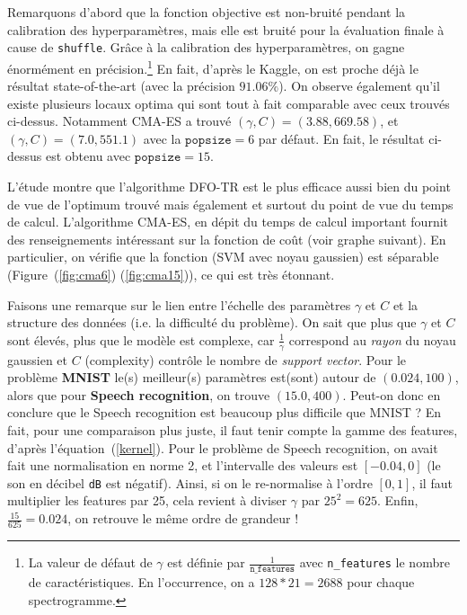 \documentclass[12 pt, a4paper]{article}
\begin{document}
Remarquons d'abord que la fonction objective est non-bruité pendant la calibration des hyperparamètres, mais elle est bruité pour la évaluation finale à cause de \texttt{shuffle}. Grâce à la calibration des hyperparamètres, on gagne énormément en précision.\footnote{La valeur de défaut de $\gamma$ est définie par $\frac{1}{\texttt{n\_features}}$ avec \texttt{n\_features} le nombre de caractéristiques. En l'occurrence, on a $128*21 = 2688$ pour chaque spectrogramme.} En fait, d'après le Kaggle, on est proche déjà le résultat state-of-the-art (avec la précision $91.06\%$)\cite{leaderboard}. On observe également qu'il existe plusieurs locaux optima qui sont tout à fait comparable avec ceux trouvés ci-dessus. Notamment CMA-ES a trouvé $(\gamma, C) = (3.88, 669.58)$, et $(\gamma, C) = (7.0, 551.1)$ avec la $\texttt{popsize}=6$ par défaut. En fait, le résultat ci-dessus est obtenu avec $\texttt{popsize} = 15$.


L'étude montre que l'algorithme DFO-TR est le plus efficace aussi bien du point de vue de l'optimum trouvé mais également et surtout du point de vue du temps de calcul. L'algorithme CMA-ES, en dépit du temps de calcul important fournit des renseignements intéressant sur la fonction de coût (voir graphe suivant). En particulier, on vérifie que la fonction (SVM avec noyau gaussien) est séparable (Figure~(\ref{fig:cma6}) (\ref{fig:cma15})), ce qui est très étonnant.

Faisons une remarque sur le lien entre l'échelle des paramètres $\gamma$ et $C$ et la structure des données (i.e. la difficulté du problème). On sait que plus que $\gamma$ et $C$ sont élevés, plus que le modèle est complexe, car $\frac{1}{\gamma}$ correspond au \textit{rayon} du noyau gaussien et $C$ (complexity) contrôle le nombre de \textit{support vector}. Pour le problème \textbf{MNIST} le(s) meilleur(s) paramètres est(sont) autour de $(0.024, 100)$, alors que pour \textbf{Speech recognition}, on trouve $(15.0, 400)$. Peut-on donc en conclure que le Speech recognition est beaucoup plus difficile que MNIST ? En fait, pour une comparaison plus juste, il faut tenir compte la gamme des features, d'après l'équation~(\ref{kernel}). Pour le problème de Speech recognition, on avait fait une normalisation en norme 2, et l'intervalle des valeurs est $[-0.04, 0]$ (le son en décibel \texttt{dB} est négatif). Ainsi, si on le re-normalise à l'ordre $[0, 1]$, il faut multiplier les features par 25, cela revient à diviser $\gamma$ par $25^2 = 625$. Enfin, $\frac{15}{625} = 0.024$, on retrouve le même ordre de grandeur !  
\end{document}
